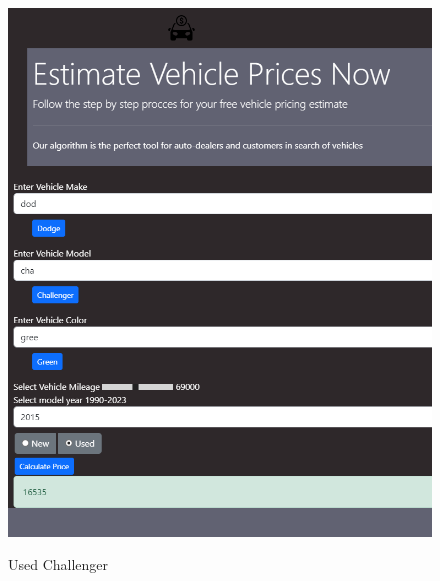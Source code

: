 \documentclass[12pt]{article}
\begin{document}
\begin{figure}[H]
\caption{Used Challenger}
\centering
\includegraphics[scale=.6]{figures/UsedChallenger.png}\\
\end{figure}
\end{document}
